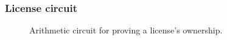 
\subsubsection{License circuit}
\label{sec:license-circuit}

\begin{figure}[h]
	\centering
	\caption{Arithmetic circuit for proving a license's ownership.}
	\label{fig:license-circuit}
\end{figure}